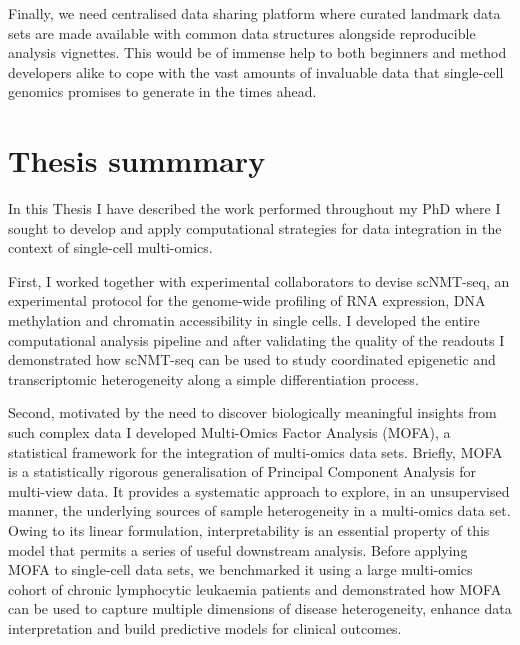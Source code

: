 Finally, we need centralised data sharing platform where curated landmark data sets are made available with common data structures alongside reproducible analysis vignettes. This would be of immense help to both beginners and method developers alike to cope with the vast amounts of invaluable data that single-cell genomics promises to generate in the times ahead.

\pagebreak

\section{Thesis summmary}

In this Thesis I have described the work performed throughout my PhD where I sought to develop and apply computational strategies for data integration in the context of single-cell multi-omics.

First, I worked together with experimental collaborators to devise scNMT-seq, an experimental protocol for the genome-wide profiling of RNA expression, DNA methylation and chromatin accessibility in single cells. I developed the entire computational analysis pipeline and after validating the quality of the readouts I demonstrated how scNMT-seq can be used to study coordinated epigenetic and transcriptomic heterogeneity along a simple differentiation process.

Second, motivated by the need to discover biologically meaningful insights from such complex data I developed Multi-Omics Factor Analysis (MOFA), a statistical framework for the integration of multi-omics data sets. Briefly, MOFA is a statistically rigorous generalisation of Principal Component Analysis for multi-view data. It provides a systematic approach to explore, in an unsupervised manner, the underlying sources of sample heterogeneity in a multi-omics data set. Owing to its linear formulation, interpretability is an essential property of this model that permits a series of useful downstream analysis. Before applying MOFA to single-cell data sets, we benchmarked it using a large multi-omics cohort of chronic lymphocytic leukaemia patients and demonstrated how MOFA can be used to capture multiple dimensions of disease heterogeneity, enhance data interpretation and build predictive models for clinical outcomes.

